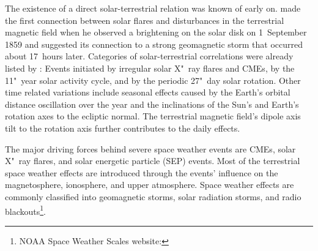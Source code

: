 The existence of a direct solar-terrestrial relation was known of early on. \citet{Carrington1859} made the first connection between solar flares and disturbances in the terrestrial magnetic field when he observed a brightening on the solar disk on 1~September 1859 and suggested its connection to a strong geomagnetic storm that occurred about 17~hours later. Categories of solar-terrestrial correlations were already listed by \citet{Bartels1962}: Events initiated by irregular solar X"~ray flares and CMEs, by the 11"~year solar activity cycle, and by the periodic 27"~day solar rotation. Other time related variations include seasonal effects caused by the Earth's orbital distance oscillation over the year and the inclinations of the Sun's and Earth's rotation axes to the ecliptic normal. The terrestrial magnetic field's dipole axis tilt to the rotation axis further contributes to the daily effects.

The major driving forces behind severe space weather events are CMEs, solar X"~ray flares, and solar energetic particle (SEP) events. Most of the terrestrial space weather effects are introduced through the events' influence on the magnetosphere, ionosphere, and upper atmosphere. Space weather effects are commonly classified into geomagnetic storms, solar radiation storms, and radio blackouts\footnote{NOAA Space Weather Scales website: }.

